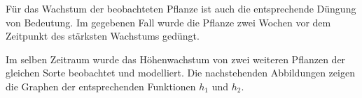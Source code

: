 \documentclass[a4paper,12pt]{article}
\begin{document}
\begin{langesbeispiel}
\begin{aufgabenstellung}
\item %


\item Für das Wachstum der beobachteten Pflanze ist auch die entsprechende Düngung von Bedeutung. Im gegebenen Fall wurde die Pflanze zwei Wochen vor dem Zeitpunkt des stärksten Wachstums gedüngt.%


\item Im selben Zeitraum wurde das Höhenwachstum von zwei weiteren Pflanzen der gleichen Sorte beobachtet und modelliert. Die nachstehenden Abbildungen zeigen die Graphen der
entsprechenden Funktionen $h_1$ und $h_2$.


\end{aufgabenstellung}
\end{langesbeispiel}
\end{document}
